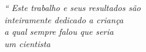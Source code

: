 \begin{epigrafe}
	\vspace*{\fill}
	\begin{flushright}
		\textit{``
		Este trabalho e seus resultados são
		\\ inteiramente dedicado a criança
		\\ a qual sempre falou que seria 
		\\ um cientista}
	\end{flushright}
\end{epigrafe}
